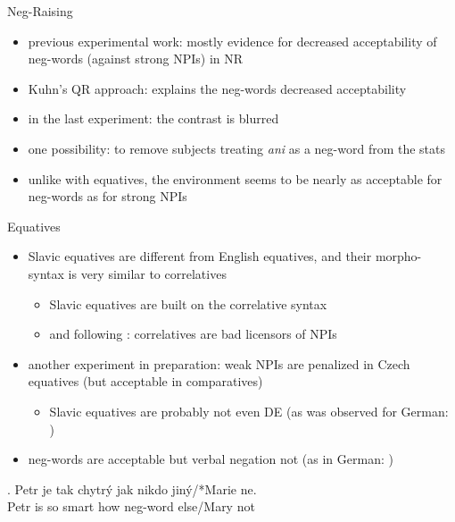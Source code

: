 \documentclass[
  ignorenonframetext,
]{beamer}
\providecommand{\tightlist}{%
  \setlength{\itemsep}{0pt}\setlength{\parskip}{0pt}}
\begin{document}
\begin{frame}
\begin{block}{Neg-Raising}
\protect\hypertarget{neg-raising-1}{}
\begin{itemize}
\tightlist
\item
  previous experimental work: mostly evidence for decreased
  acceptability of neg-words (against strong NPIs) in NR
\item
  Kuhn's QR approach: explains the neg-words decreased acceptability
\item
  in the last experiment: the contrast is blurred
\item
  one possibility: to remove subjects treating \emph{ani} as a neg-word
  from the stats
\item
  unlike with equatives, the environment seems to be nearly as
  acceptable for neg-words as for strong NPIs
\end{itemize}
\end{block}
\end{frame}

\begin{frame}
\begin{block}{Equatives}
\protect\hypertarget{equatives}{}
\begin{itemize}
\tightlist
\item
  Slavic equatives are different from English equatives, and their
  morpho-syntax is very similar to correlatives

  \begin{itemize}
  \tightlist
  \item
    Slavic equatives are built on the correlative syntax
  \item
    and following \cite{pauline1995quantificational}: correlatives are
    bad licensors of NPIs
  \end{itemize}
\item
  another experiment in preparation: weak NPIs are penalized in Czech
  equatives (but acceptable in comparatives)

  \begin{itemize}
  \tightlist
  \item
    Slavic equatives are probably not even DE (as was observed for
    German: \citealt{krifka1992some,penka2016degree})
  \end{itemize}
\item
  neg-words are acceptable but verbal negation not (as in German:
  \citealt{penka2016degree})
\end{itemize}

\exg. Petr je tak chytrý jak nikdo jiný/*Marie ne.\\
Petr is so smart how neg-word else/Mary not\\
\hspace*{0.333em}

~
\end{block}
\end{frame}
\end{document}
